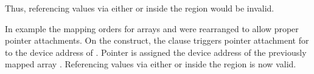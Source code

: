 Thus, referencing values via either  or  inside
the  region would be invalid.


In example  the mapping orders for arrays 
and  were rearranged to allow proper pointer attachments.
On the  construct, the  clause triggers pointer
attachment for  to the device address of . 
Pointer  is assigned the device address of the previously mapped
 array .
Referencing values via either  or  inside the  region is now valid.


